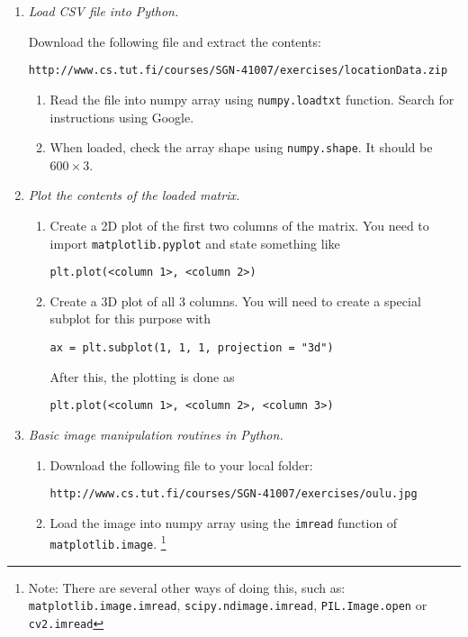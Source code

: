 \documentclass[a4paper,12pt]{scrartcl}
\newcommand{\python}{{\fbox{\texttt{\bfseries python}}\quad}}
\begin{document}
\begin{enumerate}

\item \python \emph{Load CSV file into Python.}

Download the following file and extract the contents:
{\small
\begin{verbatim}
http://www.cs.tut.fi/courses/SGN-41007/exercises/locationData.zip
\end{verbatim}
}
\label{ex1}

\begin{enumerate}
	\item Read the file into numpy array using \verb|numpy.loadtxt| function.
Search for instructions using Google.
\item When loaded, check the array shape using \verb|numpy.shape|. It should be $600\times 3$.
\end{enumerate}

\item \python \emph{Plot the contents of the loaded matrix.}
\begin{enumerate}
\item Create a 2D plot of the first two columns of the matrix.
You need to import \verb+matplotlib.pyplot+ and state something like
\begin{verbatim}
plt.plot(<column 1>, <column 2>)
\end{verbatim}
\item Create a 3D plot of all 3 columns. You will need to create a special subplot 
for this purpose with 
\begin{verbatim}
ax = plt.subplot(1, 1, 1, projection = "3d")
\end{verbatim}
After this, the plotting is done as
\begin{verbatim}
plt.plot(<column 1>, <column 2>, <column 3>)
\end{verbatim}
\end{enumerate}

\item \python \emph{Basic image manipulation routines in Python.}
\begin{enumerate}
\item Download the following file to your local folder:
{\small
\begin{verbatim}
http://www.cs.tut.fi/courses/SGN-41007/exercises/oulu.jpg
\end{verbatim}
}
\item Load the image into numpy array using the \verb+imread+ function
of \verb+matplotlib.image+.
\footnote{Note: There are several other ways of doing this, such as:
\texttt{matplotlib.image.imread}, \texttt{scipy.ndimage.imread},\quad 
\texttt{PIL.Image.open} \quad or \quad \texttt{cv2.imread}}


\end{enumerate}
\end{enumerate}
\end{document}
